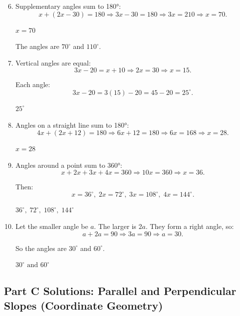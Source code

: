 \documentclass[14pt]{extarticle}
\begin{document}
\begin{enumerate}
  \setcounter{enumi}{5}
  \item Supplementary angles sum to 180°:
  \[
  x + (2x - 30) = 180
  \Rightarrow 3x - 30 = 180
  \Rightarrow 3x = 210
  \Rightarrow x = 70.
  \]

  \(\boxed{x = 70}\)

  The angles are \(70^\circ\) and \(110^\circ.\)

  \item Vertical angles are equal:
  \[
  3x - 20 = x + 10
  \Rightarrow 2x = 30
  \Rightarrow x = 15.
  \]

  Each angle:
  \[
  3x - 20 = 3(15) - 20 = 45 - 20 = 25^\circ.
  \]

  \(\boxed{25^\circ}\)

  \item Angles on a straight line sum to 180°:
  \[
  4x + (2x + 12) = 180
  \Rightarrow 6x + 12 = 180
  \Rightarrow 6x = 168
  \Rightarrow x = 28.
  \]

  \(\boxed{x = 28}\)

  \item Angles around a point sum to 360°:
  \[
  x + 2x + 3x + 4x = 360
  \Rightarrow 10x = 360
  \Rightarrow x = 36.
  \]

  Then:
  \[
  x = 36^\circ,\;
  2x = 72^\circ,\;
  3x = 108^\circ,\;
  4x = 144^\circ.
  \]

  \(\boxed{36^\circ,\;72^\circ,\;108^\circ,\;144^\circ}\)

  \item Let the smaller angle be \(a.\) The larger is \(2a.\)  
  They form a right angle, so:
  \[
  a + 2a = 90
  \Rightarrow 3a = 90
  \Rightarrow a = 30.
  \]

  So the angles are \(30^\circ\) and \(60^\circ.\)

  \(\boxed{30^\circ \text{ and } 60^\circ}\)
\end{enumerate}

\subsection*{Part C Solutions: Parallel and Perpendicular Slopes (Coordinate Geometry)}
\end{document}
